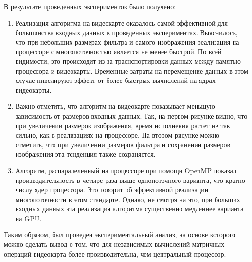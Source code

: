 \clearpage
{}

В результате проведенных экспериментов было получено:

\begin{enumerate}
    \item Реализация алгоритма на видеокарте оказалось самой эффективной для большинства входных данных в проведенных экспериментах. 
    Выяснилось, что при небольших размерах фильтра и самого изображения реализация на процессоре с многопоточностью является не менее быстрой. 
    По всей видимости, это происходит из-за траснспортировки данных между памятью процессора и видеокарты. Временные затраты на перемещение 
    данных в этом случае нивелируют эффект от более быстрых вычислений на ядрах видеокарты.
    
    \item Важно отметить, что алгоритм на видеокарте показывает меньшую зависимость от размеров входных данных. Так, на первом рисунке видно, 
    что при увеличении размеров изображения, время исполнения растет не так сильно, как в реализациях на процессоре. На втором рисунке можно 
    отметить, что при увеличении размеров фильтра и сохранении размеров изображения эта тенденция также сохраняется.
    
    \item Алгоритм, распаралеленный на процессоре при помощи OpenMP показал производительность в четыре раза выше однопоточного варианта, что кратно числу ядер 
    процессора. Это говорит об эффективной реализации многопоточности в этом стандарте. Однако, не смотря на это, при больших входных данных 
    эта реализация алгоритма существенно медленнее варианта на GPU.
    
\end{enumerate}

Таким образом, был проведен экспериментальный анализ, на основе которого можно сделать вывод о том, что для независимых вычислений матричных 
операций видеокарта более производительна, чем центральный процессор.
\clearpage
